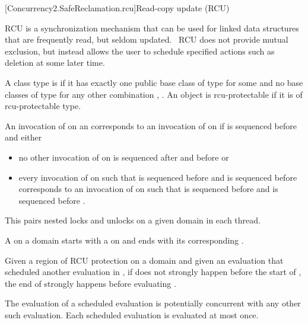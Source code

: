 
[Concurrency2.SafeReclamation.rcu]{Read-copy update (RCU)}

\pnum
RCU is a synchronization mechanism that can be used for linked data
structures that are frequently read, but seldom updated.  RCU does
not provide mutual exclusion, but instead allows the user to schedule
specified actions such as deletion at some later time.

\pnum
A class type  is  if it has exactly one
public base class of type  for some 
and no base classes of type  for any other
combination , . An object is rcu-protectable if it is
of rcu-protectable type.

\pnum
An invocation of  on an  corresponds
to an invocation of  on  if  is
sequenced before  and either

\begin{itemize}
\item	no other invocation of  on  is sequenced
	after  and before  or
\item	every invocation of  on  such
	that  is sequenced before  and 
	is sequenced before  corresponds to an invocation of
	 on  such that  is sequenced
	before  and  is sequenced before .
\end{itemize}

\pnum
\begin{note}
This pairs nested locks and unlocks on a given domain in each thread.
\end{note}

\pnum
A  on a domain  starts
with a  on  and ends with its corresponding
.

\pnum
Given a region of RCU protection  on a domain 
and given an evaluation  that scheduled another evaluation
 in , if  does not strongly happen before
the start of , the end of  strongly happens before
evaluating .

\pnum
The evaluation of a scheduled evaluation is potentially concurrent with
any other such evaluation. Each scheduled evaluation is evaluated at
most once.

